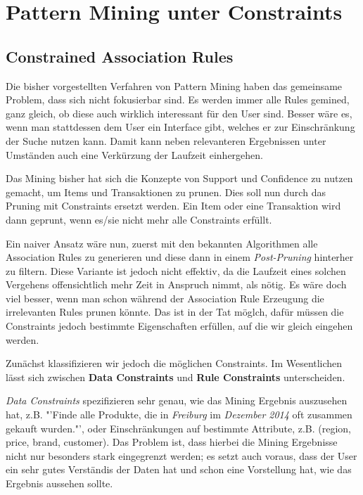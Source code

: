\section{Pattern Mining unter Constraints}
\subsection{Constrained Association Rules}
Die bisher vorgestellten Verfahren von Pattern Mining
haben das gemeinsame Problem, dass sich nicht fokusierbar
sind. Es werden immer alle Rules gemined, ganz gleich, ob
diese auch wirklich interessant für den User sind. Besser
wäre es, wenn man stattdessen dem User ein Interface gibt,
welches er zur Einschränkung der Suche nutzen kann. Damit
kann neben relevanteren Ergebnissen unter Umständen auch
eine Verkürzung der Laufzeit einhergehen. 

Das Mining bisher hat sich die Konzepte von Support und
Confidence zu nutzen gemacht, um Items und Transaktionen
zu prunen. Dies soll nun durch das Pruning mit Constraints
ersetzt werden. Ein Item oder eine Transaktion wird dann
geprunt, wenn es/sie nicht mehr alle Constraints erfüllt.

Ein naiver Ansatz wäre nun, zuerst mit den bekannten 
Algorithmen alle Association Rules zu generieren und diese
dann in einem \textit{Post-Pruning} hinterher zu filtern.
Diese Variante ist jedoch nicht effektiv, da
die Laufzeit eines solchen Vergehens offensichtlich mehr
Zeit in Anspruch nimmt, als nötig. Es wäre doch viel besser,
wenn man schon während der Association Rule Erzeugung
die irrelevanten Rules prunen könnte. Das ist in der Tat
möglch, dafür müssen die Constraints jedoch bestimmte
Eigenschaften erfüllen, auf die wir gleich eingehen werden.

Zunächst klassifizieren wir jedoch die möglichen Constraints.
Im Wesentlichen lässt sich zwischen \textbf{Data Constraints}
und \textbf{Rule Constraints} unterscheiden.

\textit{Data Constraints} spezifizieren sehr genau, wie das
Mining Ergebnis auszusehen hat, z.B. "'Finde alle Produkte,
die in \textit{Freiburg} im \textit{Dezember 2014} oft
zusammen gekauft wurden."', oder Einschränkungen auf 
bestimmte Attribute, z.B. (region, price, brand, customer).
Das Problem ist, dass hierbei die Mining Ergebnisse nicht
nur besonders stark eingegrenzt werden; es setzt auch voraus,
dass der User ein sehr gutes Verständis der Daten hat und
schon eine Vorstellung hat, wie das Ergebnis aussehen sollte.

